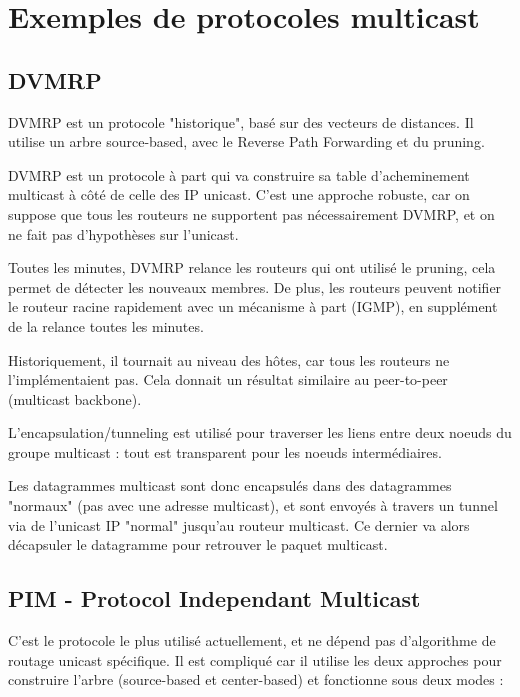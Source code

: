 	\section{Exemples de protocoles multicast}
	
		\subsection{DVMRP}
		
		DVMRP est un protocole "historique", basé sur des vecteurs de distances. Il utilise un arbre source-based, avec le Reverse Path Forwarding et du pruning.
		
		DVMRP est un protocole à part qui va construire sa table d'acheminement multicast à côté de celle des IP unicast. C'est une approche robuste, car on suppose que tous les routeurs ne supportent pas nécessairement DVMRP, et on ne fait pas d'hypothèses sur l'unicast.
		
		Toutes les minutes, DVMRP relance les routeurs qui ont utilisé le pruning, cela permet de détecter les nouveaux membres. De plus, les routeurs peuvent notifier le routeur racine rapidement avec un mécanisme à part (IGMP), en supplément de la relance toutes les minutes.
		
		Historiquement, il tournait au niveau des hôtes, car tous les routeurs ne l'implémentaient pas. Cela donnait un résultat similaire au peer-to-peer (multicast backbone).
		
		L'encapsulation/tunneling est utilisé pour traverser les liens entre deux noeuds du groupe multicast : tout est transparent pour les noeuds intermédiaires.
		
		
		Les datagrammes multicast sont donc encapsulés dans des datagrammes "normaux" (pas avec une adresse multicast), et sont envoyés à travers un tunnel via de l'unicast IP "normal" jusqu'au routeur multicast. Ce dernier va alors décapsuler le datagramme pour retrouver le paquet multicast.
			
		\subsection{PIM - Protocol Independant Multicast}
		
		C'est le protocole le plus utilisé actuellement, et ne dépend pas d'algorithme de routage unicast spécifique. Il est compliqué car il utilise les deux approches pour construire l'arbre (source-based et center-based) et fonctionne sous deux modes :
		
